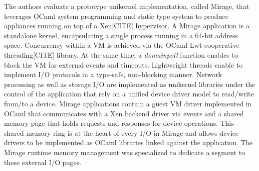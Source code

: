%
%
%

The authors evaluate a prototype unikernel implementation, called Mirage, that leverages OCaml system programming and static type system to produce appliances running on top of a Xen[CITE] hypervisor.
A Mirage application is a standalone kernel, encapsulating a single process running in a 64-bit address space.
Concurrency within a VM is achieved via the OCaml Lwt cooperative threading[CITE] library.
At the same time, a \emph{domainpoll} function enables to block the VM for external events and timeouts.
Lightweight threads enable to implement I/O protocols in a type-safe, non-blocking manner.
Network processing as well as storage I/O are implemented as unikernel libraries under the control of the application that rely on a unified device driver model to read/write from/to a device.
Mirage applications contain a guest VM driver implemented in OCaml that communicates with a Xen backend driver via events and a shared memory page that holds requests and responses for device operations.
This shared memory ring is at the heart of every I/O in Mirage and allows device drivers to be implemented as OCaml libraries linked against the application.
The Mirage runtime memory management was specialized to dedicate a segment to these external I/O pages.

